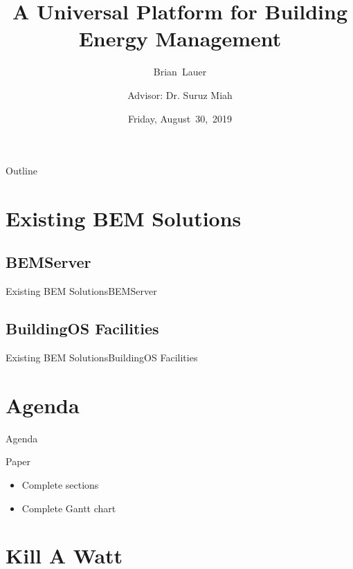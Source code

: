 \documentclass{beamer}
\title[Progress Update]{A Universal Platform for Building Energy Management}
\author[B.~Lauer]{Brian~Lauer \\\and
Advisor: Dr. Suruz Miah}
\institute[Bradley University] %
{
  Department of Electrical and Computer Engineering\\
  Bradley University\\
  1501 W. Bradley Avenue\\
  Peoria, IL, 61625, USA
}
\date[August~30,~2019]{Friday, August~30,~2019}
\begin{document}
\begin{frame}
  \titlepage
\end{frame}

\begin{frame}{Outline}
  \tableofcontents
\end{frame}

\section{Existing BEM Solutions}
\subsection{BEMServer}

\begin{frame}{Existing BEM Solutions}{BEMServer}
\end{frame}

\subsection{BuildingOS Facilities}

\begin{frame}{Existing BEM Solutions}{BuildingOS Facilities}
\end{frame}

\section{Agenda}
\begin{frame}{Agenda}
\begin{block}{Paper}
\begin{itemize}
	\item Complete sections
	\item Complete Gantt chart
\end{itemize}
\end{block}
\end{frame}

\section{Kill A Watt}
\end{document}
